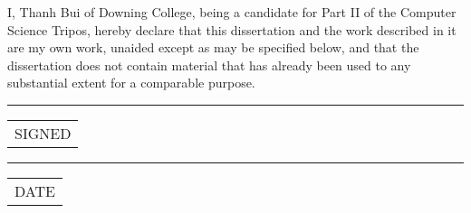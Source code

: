 I, Thanh Bui of Downing College, being a candidate for Part II of the Computer
Science Tripos, hereby declare that this dissertation and the work described in it are my own work, unaided except as may be specified below, and that the dissertation
does not contain material that has already been used to any substantial extent for a comparable purpose.

\begin{minipage}[t]{0.4\textwidth}
	\vspace*{1.5cm}  %
	\hrule
	\vspace{1mm} %
	\begin{tabular}[t]{l}
		SIGNED
	\end{tabular}
\end{minipage} 
\hspace{2cm}
\begin{minipage}[t]{0.4\textwidth}
	\vspace*{1.5cm}  %
	\hrule
	\vspace{1mm} %
	\begin{tabular}[t]{l}
		DATE
	\end{tabular}
\end{minipage}